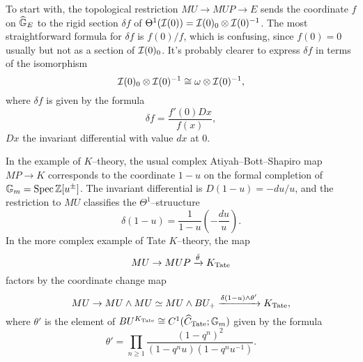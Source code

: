 To start with, the topological restriction $MU \to MUP \to E$ sends the coordinate $f$ on $\widehat{\mathbb G}_E$ to the rigid section $\delta f$ of $\Theta^1(\mathcal{I}(0)) = \mathcal{I}(0)_{0} \otimes \mathcal{I}(0)^{-1}$.  The most straightforward formula for $\delta f$ is $f(0) / f$, which is confusing, since $f(0) = 0$ usually but not as a section of $\mathcal{I}(0)_0$.  It's probably clearer to express $\delta f$ in terms of the isomorphism \[\mathcal{I}(0)_0 \otimes \mathcal{I}(0)^{-1} \cong \omega \otimes \mathcal{I}(0)^{-1},\] where $\delta f$ is given by the formula \[\delta f = \frac{f'(0) Dx}{f(x)},\] $Dx$ the invariant differential with value $dx$ at $0$.

In the example of $K$--theory, the usual complex Atiyah--Bott--Shapiro map $MP \to K$ corresponds to the coordinate $1 - u$ on the formal completion of $\mathbb G_m = \operatorname{Spec} \mathbb Z[u^\pm]$.  The invariant differential is $D(1 - u) = -du/u$, and the restriction to $MU$ classifies the $\Theta^1$--struucture \[\delta(1 - u) = \frac{1}{1 - u}\left(-\frac{du}{u}\right).\]  In the more complex example of Tate $K$--theory, the map \[MU \to MUP \xrightarrow{\tilde\theta} K_{\mathrm{Tate}}\] factors by the coordinate change map \[MU \to MU \wedge MU \simeq MU \wedge BU_+ \xrightarrow{\delta(1 - u) \wedge \theta'} K_{\mathrm{Tate}},\] where $\theta'$ is the element of $BU^{K_{\mathrm{Tate}}} \cong C^1(\widehat C_{\mathrm{Tate}}; \mathbb G_m)$ given by the formula \[\theta' = \prod_{n \ge 1} \frac{(1 - q^n)^2}{(1 - q^n u)(1 - q^n u^{-1})}.\]

